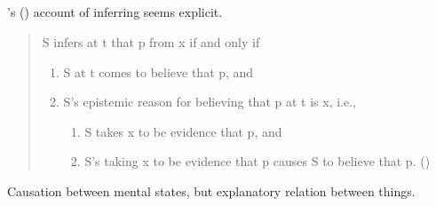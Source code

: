 \subsection*{\textcite{Longino:1978wv}}

\begin{note}
  \citeauthor{Longino:1978wv}'s (\citeyear{Longino:1978wv}) account of inferring seems explicit.
  \begin{quote}
    S infers at t that p from x if and only if
    \begin{enumerate}[label=\arabic*.]
    \item
      S at t comes to believe that p, and
    \item
      S's epistemic reason for believing that p at t is x, i.e.,
      \begin{enumerate}[label=\alph*.]
      \item
        S takes x to be evidence that p, and
      \item
        S's taking x to be evidence that p causes S to believe that p.\newline
        \mbox{}\hfill\mbox{(\citeyear[22]{Longino:1978wv})}
      \end{enumerate}
    \end{enumerate}
  \end{quote}
  Causation between mental states, but explanatory relation between things.
\end{note}




